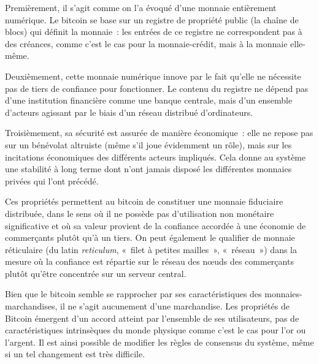 Premièrement, il s'agit comme on l'a évoqué d'une monnaie entièrement numérique. Le bitcoin se base sur un registre de propriété public (la chaîne de blocs) qui définit la monnaie~: les entrées de ce registre ne correspondent pas à des créances, comme c'est le cas pour la monnaie-crédit, mais à la monnaie elle-même.

Deuxièmement, cette monnaie numérique innove par le fait qu'elle ne nécessite pas de tiers de confiance pour fonctionner. Le contenu du registre ne dépend pas d'une institution financière comme une banque centrale, mais d'un ensemble d'acteurs agissant par le biais d'un réseau distribué d'ordinateurs.

Troisièmement, sa sécurité est assurée de manière économique~: elle ne repose pas sur un bénévolat altruiste (même s'il joue évidemment un rôle), mais sur les incitations économiques des différents acteurs impliqués. Cela donne au système une stabilité à long terme dont n'ont jamais disposé les différentes monnaies privées qui l'ont précédé.

Ces propriétés permettent au bitcoin de constituer une monnaie fiduciaire distribuée, dans le sens où il ne possède pas d'utilisation non monétaire significative et où sa valeur provient de la confiance accordée à une économie de commerçants plutôt qu'à un tiers. On peut également le qualifier de monnaie réticulaire (du latin \emph{reticulum}, «~filet à petites mailles~», «~réseau~») dans la mesure où la confiance est répartie sur le réseau des nœuds des commerçants plutôt qu'être concentrée sur un serveur central. %

Bien que le bitcoin semble se rapprocher par ses caractéristiques des monnaies-marchandises, il ne s'agit aucunement d'une marchandise. Les propriétés de Bitcoin émergent d'un accord atteint par l'ensemble de ses utilisateurs, pas de caractéristiques intrinsèques du monde physique comme c'est le cas pour l'or ou l'argent. Il est ainsi possible de modifier les règles de consensus du système, même si un tel changement est très difficile.

